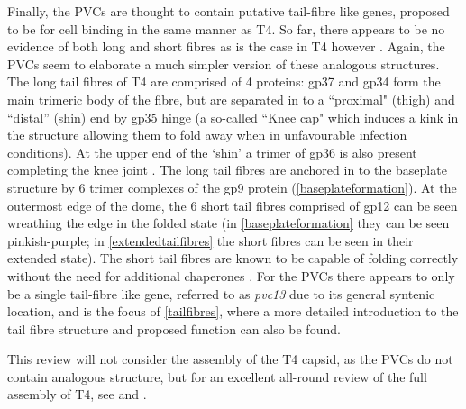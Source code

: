 Finally, the PVCs are thought to contain putative tail-fibre like genes, proposed to be for cell binding in the same manner as T4. So far, there appears to be no evidence of both long and short fibres as is the case in T4 however \citep{Bartual2010, Thomassen2003}. Again, the PVCs seem to elaborate a much simpler version of these analogous structures. The long tail fibres of T4 are comprised of 4 proteins: gp37 and gp34 form the main trimeric body of the fibre, but are separated in to a ``proximal" (thigh) and ``distal'' (shin) end by gp35 hinge (a so-called ``Knee cap" which induces a kink in the structure allowing them to fold away when in unfavourable infection conditions). At the upper end of the `shin' a trimer of gp36 is also present completing the knee joint \citep{Leiman2010}. The long tail fibres are anchored in to the baseplate structure by 6 trimer complexes of the gp9 protein (\vref{baseplateformation}). At the outermost edge of the dome, the 6 short tail fibres comprised of gp12 can be seen wreathing the edge in the folded state (in \vref{baseplateformation} they can be seen pinkish-purple; in \vref{extendedtailfibres} the short fibres can be seen in their extended state). The short tail fibres are known to be capable of folding correctly without the need for additional chaperones \citep{Leiman2010, Goldberg1997, Ali2003}. For the PVCs there appears to only be a single tail-fibre like gene, referred to as \emph{pvc13} due to its general syntenic location, and is the focus of \vref{tailfibres}, where a more detailed introduction to the tail fibre structure and proposed function can also be found. 

This review will not consider the assembly of the T4 capsid, as the PVCs do not contain analogous structure, but for an excellent all-round review of the full assembly of T4, see \cite{Yap2014a} and \cite{Leiman2010}.


